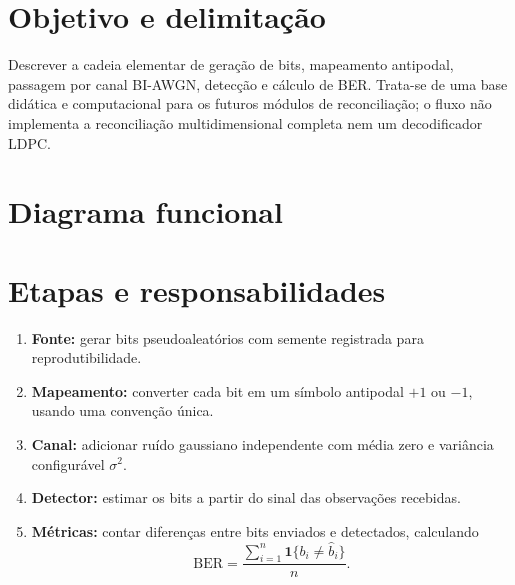 \documentclass[12pt,openright,oneside,a4paper,english,brazil]{abntex2}
\begin{document}
\frenchspacing
\imprimircapa
\textual

\chapter{Objetivo e delimitação}
Descrever a cadeia elementar de geração de bits, mapeamento antipodal, passagem por canal BI-AWGN, detecção e cálculo de BER. Trata-se de uma base didática e computacional para os futuros módulos de reconciliação; o fluxo não implementa a reconciliação multidimensional completa nem um decodificador LDPC.

\chapter{Diagrama funcional}
\begin{center}
\end{center}

\chapter{Etapas e responsabilidades}
\begin{enumerate}
\item \textbf{Fonte:} gerar bits pseudoaleatórios com semente registrada para reprodutibilidade.
\item \textbf{Mapeamento:} converter cada bit em um símbolo antipodal $+1$ ou $-1$, usando uma convenção única.
\item \textbf{Canal:} adicionar ruído gaussiano independente com média zero e variância configurável $\sigma^2$.
\item \textbf{Detector:} estimar os bits a partir do sinal das observações recebidas.
\item \textbf{Métricas:} contar diferenças entre bits enviados e detectados, calculando
\begin{equation}
\mathrm{BER}=\frac{\sum_{i=1}^{n}\mathbf{1}\{b_i\ne\hat b_i\}}{n}.
\end{equation}
\end{enumerate}
\end{document}

